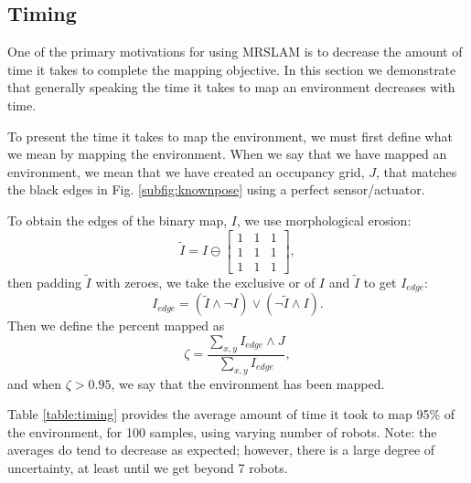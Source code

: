 \subsection{Timing}
\label{S:Exp:Timing}

One of the primary motivations for using MRSLAM is to decrease the amount of time it takes to complete the mapping objective.  In this section we demonstrate that generally speaking the time it takes to map an environment decreases with time.  

To present the time it takes to map the environment, we must first define what we mean by mapping the environment.  When we say that we have mapped an environment, we mean that we have created an occupancy grid, $J$, that matches the black edges in Fig. \ref{subfig:knownpose} using a perfect sensor/actuator.  

To obtain the edges of the binary map, $I$, we use morphological erosion:
\begin{equation}
\tilde{I}=I\ominus \begin{bmatrix}
1 & 1 & 1 \\
1 & 1 & 1 \\
1 & 1 & 1
\end{bmatrix},
\end{equation}
then padding $\tilde{I}$ with zeroes, we take the exclusive or of $I$ and $\tilde{I}$ to get $I_{edge}$:
\begin{equation}
I_{edge}=(\tilde{I}\wedge \neg I)\vee (\neg \tilde{I}\wedge I).
\end{equation}
Then we define the percent mapped as
\begin{equation}
\zeta =\frac{\sum_{x,y}I_{edge}\wedge J}{\sum_{x,y}I_{edge}},
\end{equation}
and when $\zeta>0.95$, we say that the environment has been mapped.

Table \ref{table:timing} provides the average amount of time it took to map 95\% of the environment, for 100 samples, using varying number of robots.  Note: the averages do tend to decrease as expected; however, there is a large degree of uncertainty, at least until we get beyond 7 robots.  

